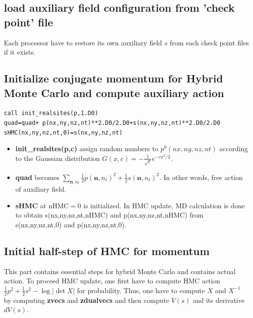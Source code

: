 \documentclass[10pt]{book}
\def\bm{\boldsymbol}
\def\vn{{\bm n}}
\begin{document}
\subsection{load auxiliary field configuration from 'check point' file} 
Each processor have to restore its own auxiliary field $s$  from each 
check point files if it exists.

\subsection{Initialize conjugate momentum for Hybrid Monte Carlo and compute auxiliary action} 
\begin{lstlisting}[frame=single]
call init_realsites(p,1.D0)
quad=quad+ p(nx,ny,nz,nt)**2.D0/2.D0+s(nx,ny,nz,nt)**2.D0/2.D0
sHMC(nx,ny,nz,nt,0)=s(nx,ny,nz,nt)
\end{lstlisting}

\begin{itemize}
\item {\bf init\_realsites(p,c)} assign random numbers to $p^0(nx,ny,nz,nt)$ according to the   
      Gaussian distribution $G(x,c)=-\frac{1}{\sqrt{c}}e^{-c x^2/2}$.
\item {\bf quad} becomes $\sum_{\vn,n_t}\frac{1}{2} p(\vn,n_t)^2+\frac{1}{2} s(\vn,n_t)^2$. 
      In other words, free action of auxiliary field.  
\item {\bf sHMC} at nHMC$=$0 is initialized. 
      In HMC update, MD calculation is done to obtain s(nx,ny,nz,nt,nHMC) and p(nx,ny,nz,nt,nHMC)
      from  s(nx,ny,nz,nt,0) and p(nx,ny,nz,nt,0).      
\end{itemize}

\subsection{Initial half-step of HMC for momentum}
This part contains essential steps for hybrid Monte Carlo and contains actual action. To proceed
HMC update, one first have to compute HMC action $\frac{1}{2}p^2+\frac{1}{2}s^2-\log|\det X|$ for probability.
Thus, one have to compute $X$ and $X^{-1}$ by computing {\bf zvecs} and {\bf zdualvecs}
and then compute $V(s)$ and its derivative $dV(s)$. 
\end{document}
